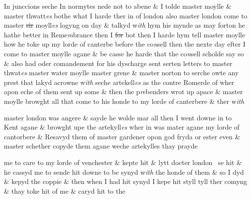 \documentclass[12pt, a4paper]{book}
\begin{document}
 		
		\ifthenelse{\isodd{\thepage}}
		{\reversemarginpar}
		{\normalmarginpar}
		In junccions seche In normytes nede not to abene \& I tolde master moylle
			\& master thwatt\textit{es} bothe what I harde ther in of london also master london
			come to master \sout{sir} moyll\textit{es} logyng on day \& talkyd w\textit{ith} hym his mynde as may
		 forton he hathe better in Reme\textit{m}brance then I \sout{for} bot then I harde hym
 			tell master moylle how he toke up my lorde of canterbe before the co\textit{n}sell
			then the nexte day efter I come to master moylle agane \& be casse he harde
		 that the co\textit{n}sell scholde say so \& also had oder comandement for his dyscharge
			sent serten letters to master thwat\textit{es} master water moylle master grene \&
			master norton to serche owte any prest that lakyd acrowne w\textit{ith} seche
		 artekell\textit{es} as the contre Romerde of wher apon eche of them sent
			up some \& then the p\textit{re}benders wrot up apace \& master moylle browght
 			all that come to his honde to my lorde of canterbere \& ther w\textit{ith}
 	
 		
				\marginpar[\vspace{0.5cm}{\textcolor{Gray}{n}}]{}
			
		
		\ifthenelse{\isodd{\thepage}}
		{\reversemarginpar}
		{\normalmarginpar}
		master london was angere \& sayde he wolde mar all then I went
		 downe in to Kent agane \& browght upe the artekyll\textit{es} wher in was
			mater agane my lorde of cantorbere \& Resavyd them
			 of master gardener
			 opon god fryda or ester even
			 \& master schether copyde them agane weche artekylles thay prayde
 	
 		
				\marginpar[\vspace{0.5cm}{\textcolor{Gray}{gardener}}]{}
			
 		
				\marginpar[\vspace{0.5cm}{\textcolor{Gray}{Shether n}}]{}
			
 		
		\ifthenelse{\isodd{\thepage}}
		{\reversemarginpar}
		{\normalmarginpar}
		
			me to care to my lorde of venchester \& kepte hit \& lytt docter london
		  se hit \& he cassyd me to sende hit downe to be synyd w\textit{ith} the honde
		 of them \& so I dyd \& kepyd the coppie \& then when I had hit synyd I kepe
		 hit styll tyll ther comyng \& thay toke hit of me \& caryd hit to the
 	
\end{document}
